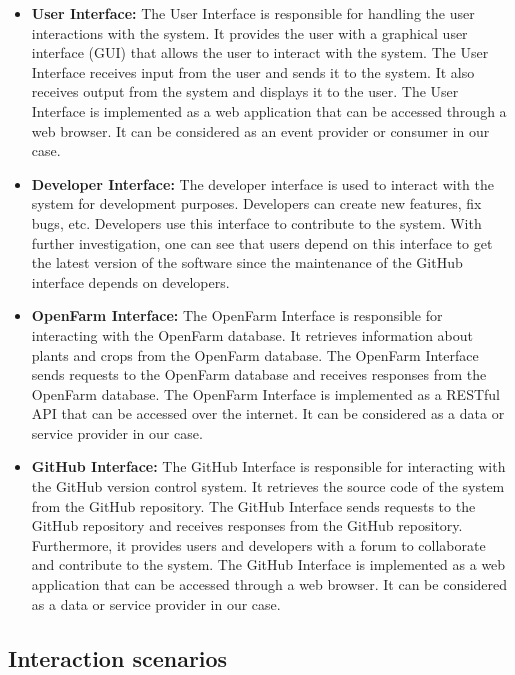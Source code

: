 \begin{itemize}
    \item \textbf{User Interface:} The User Interface is responsible for handling the user interactions with the system. It provides the user with a graphical user interface (GUI) that allows the user to interact with the system. The User Interface receives input from the user and sends it to the system. It also receives output from the system and displays it to the user. The User Interface is implemented as a web application that can be accessed through a web browser. It can be considered as an event provider or consumer in our case.
    \item \textbf{Developer Interface:} The developer interface is used to interact with the system for development purposes. Developers can create new features, fix bugs, etc. Developers use this interface to contribute to the system. With further investigation, one can see that users depend on this interface to get the latest version of the software since the maintenance of the GitHub interface depends on developers.
    \item \textbf{OpenFarm Interface:} The OpenFarm Interface is responsible for interacting with the OpenFarm database. It retrieves information about plants and crops from the OpenFarm database. The OpenFarm Interface sends requests to the OpenFarm database and receives responses from the OpenFarm database. The OpenFarm Interface is implemented as a RESTful API that can be accessed over the internet. It can be considered as a data or service provider in our case.
    \item \textbf{GitHub Interface:} The GitHub Interface is responsible for interacting with the GitHub version control system. It retrieves the source code of the system from the GitHub repository. The GitHub Interface sends requests to the GitHub repository and receives responses from the GitHub repository. Furthermore, it provides users and developers with a forum to collaborate and contribute to the system. The GitHub Interface is implemented as a web application that can be accessed through a web browser. It can be considered as a data or service provider in our case.
\end{itemize}

\subsection{Interaction scenarios}



